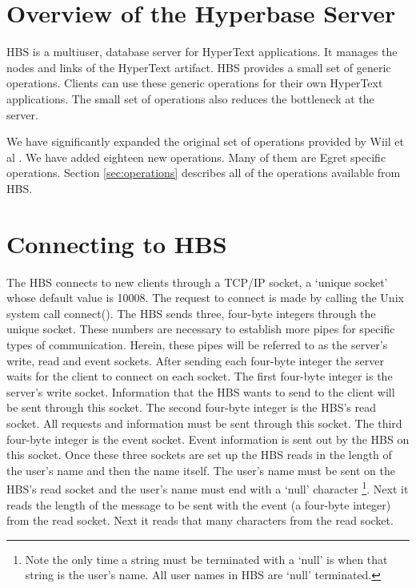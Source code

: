 \section{Overview of the Hyperbase Server}
\label{sec:overview}
HBS is a multiuser, database server for HyperText applications.  It manages
the nodes and links of the HyperText artifact.  HBS provides a small set of
generic operations.  Clients can use these generic operations for their own
HyperText applications.  The small set of operations also reduces the
bottleneck at the server.

We have significantly expanded the original set of operations provided by
Wiil et al \cite{Wiil90}.  We have added eighteen new operations.  Many of
them are Egret specific operations.  Section \ref{sec:operations} describes
all of the operations available from HBS.
\newpage
\section{Connecting to HBS}
\label{sec:connecting}

The HBS connects to new clients through a TCP/IP socket, a `unique socket'
whose default value is 10008.  The request to connect is made by calling
the Unix system call connect().  The HBS sends three, four-byte integers
through the unique socket.  These numbers are necessary to establish more
pipes for specific types of communication.  Herein, these pipes will be
referred to as the server's write, read and event sockets.  After sending
each four-byte integer the server waits for the client to connect on each
socket.  The first four-byte integer is the server's write socket.
Information that the HBS wants to send to the client will be sent through
this socket.  The second four-byte integer is the HBS's read socket.  All
requests and information must be sent through this socket.  The third
four-byte integer is the event socket.  Event information is sent out by
the HBS on this socket.  Once these three sockets are set up the HBS reads
in the length of the user's name and then the name itself.  The user's name
must be sent on the HBS's read socket and the user's name must end with a
`null' character \footnote{Note the only time a string must be terminated
with a `null' is when that string is the user's name.  All user names in
HBS are `null' terminated.}.  Next it reads the length of the message to be
sent with the event (a four-byte integer) from the read socket.  Next it
reads that many characters from the read socket.  

